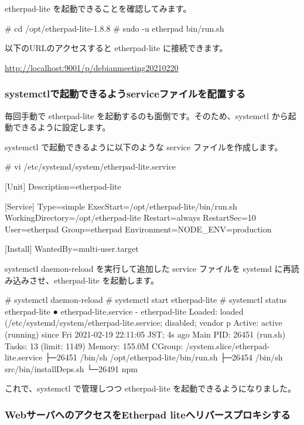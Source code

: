 \documentclass[mingoth,a4paper]{jsarticle}
\begin{document}
etherpad-lite を起動できることを確認してみます。

\begin{commandline}
# cd /opt/etherpad-lite-1.8.8
# sudo -u etherpad bin/run.sh
\end{commandline}

以下のURLのアクセスすると etherpad-lite に接続できます。

\url{http://localhost:9001/p/debianmeeting20210220}


\subsubsection{systemctlで起動できるようserviceファイルを配置する}

毎回手動で etherpad-lite を起動するのも面倒です。そのため、systemctl から起動できるように設定します。

systemctl で起動できるように以下のような service ファイルを作成します。

\begin{commandline}
# vi /etc/systemd/system/etherpad-lite.service

[Unit]
Description=etherpad-lite

[Service]
Type=simple
ExecStart=/opt/etherpad-lite/bin/run.sh
WorkingDirectory=/opt/etherpad-lite
Restart=always
RestartSec=10
User=etherpad
Group=etherpad
Environment=NODE_ENV=production

[Install]
WantedBy=multi-user.target
\end{commandline}

systemctl daemon-reload を実行して追加した service ファイルを systemd に再読み込みさせ、etherpad-lite を起動します。

\begin{commandline}
# systemctl daemon-reload
# systemctl start etherpad-lite
# systemctl status etherpad-lite
● etherpad-lite.service - etherpad-lite
   Loaded: loaded (/etc/systemd/system/etherpad-lite.service; disabled; vendor p
   Active: active (running) since Fri 2021-02-19 22:11:05 JST; 4s ago
 Main PID: 26451 (run.sh)
    Tasks: 13 (limit: 1149)
   Memory: 155.0M
   CGroup: /system.slice/etherpad-lite.service
           ├─26451 /bin/sh /opt/etherpad-lite/bin/run.sh
           ├─26454 /bin/sh src/bin/installDeps.sh
           └─26491 npm
\end{commandline}

これで、systemctl で管理しつつ etherpad-lite を起動できるようになりました。


\subsubsection{WebサーバへのアクセスをEtherpad liteへリバースプロキシする}
\end{document}
